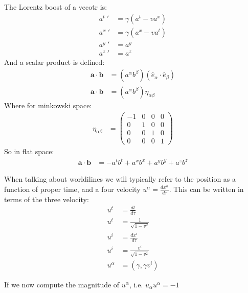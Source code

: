 The Lorentz boost of a vecotr is:
\begin{align*}
	a^t\ ' &= \gamma(a^t - va^x) \\
	a^x\ ' &= \gamma(a^x - va^t) \\
	a^y\ ' &= a^y \\
	a^z\ ' &= a^z
\end{align*}
And a scalar product is defined:
\begin{align*}
	\bm{a}\cdot\bm{b} &= (a^\alpha b^\beta) (\hat{e}_\alpha\cdot \hat{e}_\beta) \\
	\bm{a}\cdot\bm{b} &= (a^\alpha b^\beta) \eta_{\alpha\beta}
\end{align*}
Where for minkowski space:
\begin{align*}
	\eta_{\alpha\beta} &= \begin{pmatrix}
		-1 & 0 & 0 & 0 \\
		0 & 1 & 0 & 0 \\
		0 & 0 & 1 & 0 \\
		0 & 0 & 0 & 1
			      \end{pmatrix}
\end{align*}
So in flat space:
\begin{align*}
	\bm{a}\cdot\bm{b} &= -a^tb^t + a^x b^x + a^y b^y + a^z b^z
\end{align*}

When talking about worldilines we will typically refer to the position as a function of proper time, and a four velocity $u^\alpha = \frac{d x^\alpha}{d\tau}$. This can be written in terms of the three velocity:
\begin{align*}
	u^t &= \frac{dt}{d\tau} \\
	u^t &= \frac{1}{\sqrt{1-v^2}} \\
	u^i &= \frac{dx^i}{d\tau} \\
	u^i &= \frac{v^i}{\sqrt{1-v^2}} \\
	u^\alpha &= (\gamma,\gamma v^i)
\end{align*}

If we now compute the magnitude of $u^\alpha$, i.e. $u_\alpha u^\alpha = -1$

